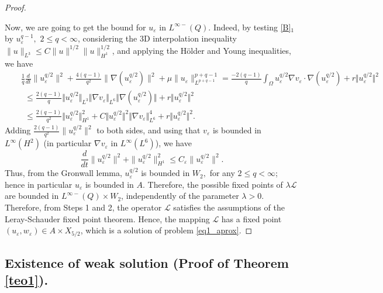 \documentclass[11pt,reqno]{amsart}%
\numberwithin{equation}{section}
\begin{document}
{\begin{proof}
\

Now, we are going to get the bound for $u_\varepsilon$ in $L^{\infty-}(Q)$.  Indeed, by testing \eqref{B}$_1$ by $u^{q-1}_\varepsilon,$ $2\leq q<\infty$, considering the 3D interpolation inequality $\|u\|_{L^3}\le C\|u\|^{1/2}\|u\|^{1/2}_{H^1}$, and applying the H\"older and Young inequalities,  we have
\begin{eqnarray*}
&&\!\frac1q\frac{d}{dt}\|u_\varepsilon^{q/2}\|^2
\!+\!\frac{4(q-1)}{q^2}\|\nabla (u_\varepsilon^{q/2})\|^2
\!+\!\mu\|u_\varepsilon\|^{p+q-1}_{L^{p+q-1}}\!=\!\frac{-2(q-1)}{q}\!\int_\Omega u_\varepsilon^{q/2}\nabla v_\varepsilon\!\cdot\! \nabla(u_\varepsilon^{q/2})\!+\!r\Vert u_\varepsilon^{q/2}\Vert^2\nonumber\\
&&\ \  \leq \frac{2(q-1)}{q}\Vert u_\varepsilon^{q/2}\Vert_{L^3}\Vert \nabla v_\varepsilon\Vert_{L^6}\Vert \nabla (u_\varepsilon^{q/2})\Vert+\!r\Vert u_\varepsilon^{q/2}\Vert^2\\
&&\ \ \leq \frac{2(q-1)}{q^2}\Vert u_\varepsilon^{q/2}\Vert^2_{H^1}+C\Vert u_\varepsilon^{q/2}\Vert^2 \Vert \nabla v_\varepsilon\Vert^4_{L^6}+\!r\Vert u_\varepsilon^{q/2}\Vert^2.\label{B-8}
\end{eqnarray*}
Adding $\frac{2(q-1)}{q^2}\|u^{q/2}_\varepsilon\|^2$ to both sides,  and using that $v_\varepsilon$ is bounded in $L^\infty(H^2)$ (in particular $\nabla v_\varepsilon$ in $L^\infty(L^6)$), we have
\begin{equation*}\label{B-9}
\frac{d}{dt}\|u^{q/2}_\varepsilon\|^2+\|u^{q/2}_\varepsilon\|^2_{H^1}\le C_\varepsilon\|u^{q/2}_\varepsilon\|^2 .
\end{equation*}
Thus, from the Gronwall lemma, $u^{q/2}_\varepsilon$ is bounded in $W_2,$ for any $2\leq q<\infty$; hence in particular $u_\varepsilon$ is bounded in $A$. Therefore, the possible fixed points of $\lambda \mathcal{L}$ are bounded in $L^{\infty-}(Q)\times W_2$, independently of the parameter $\lambda>0$. Therefore, from Steps 1 and 2, the operator $\mathcal{L}$ satisfies the assumptions of the Leray-Schauder fixed point theorem. Hence, the mapping $\mathcal{L}$ has a fixed point $(u_\varepsilon,w_\varepsilon)\in A\times X_{5/2}$, which is a solution of problem \eqref{eq1_aprox}. 
\end{proof}


\subsection{Existence of weak solution (Proof of Theorem \ref{teo1}).} \label{Se:3.1}

}
\end{document}
